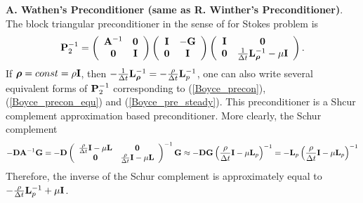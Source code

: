 \documentclass[9pt]{article}
\newcommand{\V}[1]{\boldsymbol{#1}}
\begin{document}
{\bf A. Wathen's Preconditioner (same as R. Winther's Preconditioner)}. The block triangular preconditioner in the sense of \cite{MardalWinther2004, Griffith} for Stokes problem is
\begin{equation}\label{Wathen_Pre_variable_den}
{\bf P}_2^{-1}=\left(\begin{array}{cc}
{\bf A}^{-1} & {\bf 0} \\
{\bf 0}      & {\bf I}
\end{array}\right)
\left(\begin{array}{cc}
{\bf I}     & -{\bf G} \\
{\bf 0}     &  {\bf I}
\end{array}\right)
\left(\begin{array}{cc}
{\bf I}       & {\bf 0} \\
{\bf 0}       & \frac{1}{\Delta t} {\bf L}_{\V{\rho}}^{-1} - \mu {\bf I}
\end{array}\right).
\end{equation}
If ${\V{\rho}}=const=\rho {\bf I}$, then $-\frac{1}{\Delta t} {\bf L}_{\V{\rho}}^{-1}=-\frac{\rho}{\Delta t} {\bf L}_p^{-1}$, one can also write several equivalent forms of ${\bf P}_2^{-1}$ corresponding to (\ref{Boyce_precon}), (\ref{Boyce_precon_equ}) and (\ref{Boyce_pre_steady}). This preconditioner is a Shcur complement approximation based preconditioner. More clearly, the Schur complement
$$
-{\bf D} {\bf A}^{-1} {\bf G}  = -{\bf D} \left(\begin{array}{cc}
\frac{\rho}{\Delta t} {\bf I} - \mu {\bf L} & {\bf 0} \\
{\bf 0}      & \frac{\rho}{\Delta t} {\bf I} - \mu {\bf L}
\end{array}\right)^{-1} {\bf G}
\approx -{\bf D}{\bf G} \left(\frac{\rho}{\Delta t} {\bf I} - \mu  {\bf L}_p \right)^{-1} =  -{\bf L}_p \left(\frac{\rho}{\Delta t} {\bf I} - \mu {\bf L}_p \right)^{-1}
$$
Therefore, the inverse of the Schur complement is approximately equal to  $-\frac{\rho}{\Delta t} {\bf L}_p^{-1} + \mu {\bf I}$.
\end{document}
